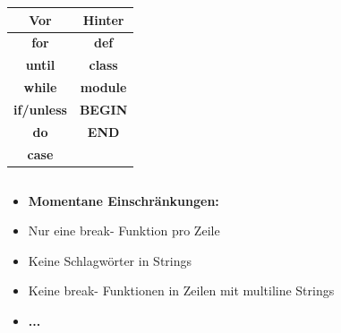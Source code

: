 \begin{frame}
	\begin{center}
		\begin{tabular}{c|c}
			\textbf{Vor} & \textbf{Hinter} \\ 
			\hline 
			\textbf{for} & \textbf{def} \\ 
			\textbf{until} & \textbf{class} \\
			\textbf{while} & \textbf{module} \\
			\textbf{if/unless} & \textbf{BEGIN} \\
			\textbf{do} & \textbf{END} \\
			\textbf{case} &  \\
		\end{tabular}
	\end{center}
\end{frame}

\begin{frame}
	\inputminted[linenos, frame=lines, label=Beispiel]{ruby}{scopes/beispiel.rb}
\end{frame}

\begin{frame}
	\begin{itemize}
		\item[]\textbf{Momentane Einschränkungen:}
		\item[]Nur eine break- Funktion pro Zeile
		\item[]Keine Schlagwörter in Strings
		\item[]Keine break- Funktionen in Zeilen mit multiline Strings
		\item[]\textbf{...}
	\end{itemize}
\end{frame}
